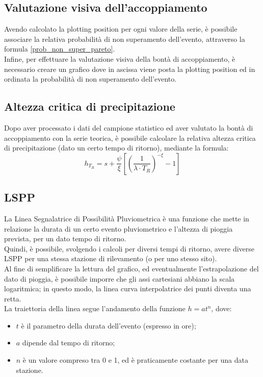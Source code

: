 \subsection{Valutazione visiva dell'accoppiamento}
Avendo calcolato la plotting position per ogni valore della serie, è possibile associare la relativa probabilità di non superamento dell'evento, attraverso la formula \ref{prob_non_super_pareto}.\\
Infine, per effettuare la valutazione visiva della bontà di accoppiamento, è necessario creare un grafico dove in ascissa viene posta la plotting position ed in ordinata la probabilità di non superamento dell'evento.


\subsection{Altezza critica di precipitazione}
Dopo aver processato i dati del campione statistico ed aver valutato la bontà di accoppiamento con la serie teorica, è possibile calcolare la relativa altezza critica di precipitazione (dato un certo tempo di ritorno), mediante la formula:
\begin{equation}
    h_{T_R} = s + \frac{\psi}{\xi} \left[ \left(\frac{1}{\lambda \cdot T_R} \right) ^{-\xi} - 1 \right]
    \label{h_critica_tr}
\end{equation}

\subsection{LSPP}
La Linea Segnalatrice di Possibilità Pluviometrica è una funzione che mette in relazione la durata di un certo evento pluviometrico e l'altezza di pioggia prevista, per un dato tempo di ritorno.\\
Quindi, è possibile, svolgendo i calcoli per diversi tempi di ritorno, avere diverse LSPP per una stessa stazione di rilevamento (o per uno stesso sito).\\
Al fine di semplificare la lettura del grafico, ed eventualmente l'estrapolazione del dato di pioggia, è possibile imporre che gli assi cartesiani abbiano la scala logaritmica; in questo modo, la linea curva interpolatrice dei punti diventa una retta.\\
La traiettoria della linea segue l'andamento della funzione $h=at^n$, dove:
\begin{itemize}
\item $t$ è il parametro della durata dell'evento (espresso in ore);
\item $a$ dipende dal tempo di ritorno;    
\item $n$ è un valore compreso tra 0 e 1, ed è praticamente costante per una data stazione.
\end{itemize}

